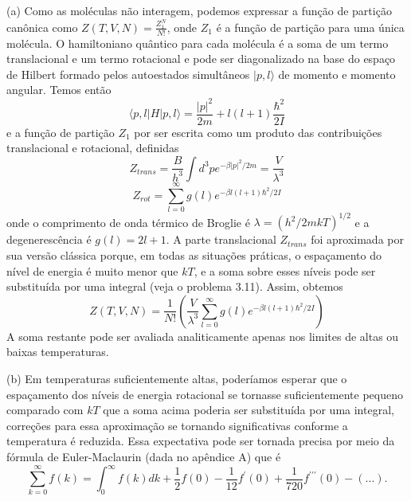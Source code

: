 \documentclass[12pt]{article}
\begin{document}
(a) Como as moléculas não interagem, podemos expressar a função de partição canônica como $Z(T, V, N) = \frac{Z^{N}_{1}}{N!}$, onde $Z_{1}$ é a função de partição para uma única molécula. O hamiltoniano quântico para cada molécula é a soma de um termo translacional e um termo rotacional e pode ser diagonalizado na base do espaço de Hilbert formado pelos autoestados simultâneos $|p, l\rangle$ de momento e momento angular. Temos então
\begin{equation}
\langle p,l| H |p,l\rangle = \frac{|p|^{2}}{2m} + l(l+1)\frac{\hbar^{2}}{2I}
\end{equation}
e a função de partição $Z_{1}$ por ser escrita como um produto das contribuições translacional e rotacional, definidas
\begin{equation}
    Z_{trans} = \frac{B}{h^{3}} \int d^{3} p e^{- \beta |p|^{2}/2m} = \frac{V}{\lambda^{3}}
\end{equation}
\begin{equation}
Z_{rot} = \sum^{\infty}_{l=0} g(l)e^{- \beta l(l+1)\hbar^{2}/2I}
\end{equation}
onde o comprimento de onda térmico de Broglie é $\lambda = (h^{2}/2mkT)^{1/2}$ e a degenerescência é $ g(l) = 2l + 1$. A parte translacional $Z_{trans}$ foi aproximada por sua versão clássica porque, em todas as situações práticas, o espaçamento do nível de energia é muito menor que $kT$, e a soma sobre esses níveis pode ser substituída por uma integral (veja o problema 3.11). Assim, obtemos
\begin{equation}
Z(T, V, N) = \frac{1}{N!} \left(\frac{V}{\lambda^{3}}\sum^{\infty}_{l=0}g(l)e^{- \beta l(l+1)\hbar^{2}/2I}\right)
\end{equation}
A soma restante pode ser avaliada analiticamente apenas nos limites de altas ou baixas temperaturas.

(b) Em temperaturas suficientemente altas, poderíamos esperar que o espaçamento dos níveis de energia rotacional se tornasse suficientemente pequeno comparado com $kT$ que a soma acima poderia ser substituída por uma integral, correções para essa aproximação se tornando significativas conforme a temperatura é reduzida. Essa expectativa pode ser tornada precisa por meio da fórmula de Euler-Maclaurin (dada no apêndice A) que é
\begin{equation}
\sum^{\infty}_{k=0} f(k) = \int^{\infty}_{0} f(k)dk + \frac{1}{2}f(0) - \frac{1}{12}f^{\prime}(0) + \frac{1}{720}f^{\prime \prime \prime}(0) - (...).
\end{equation}
\end{document}
